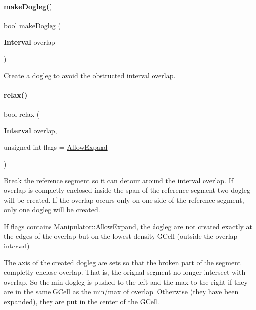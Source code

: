 \paragraph{\texorpdfstring{make\+Dogleg()}{makeDogleg()}\hspace{0.1cm}{\footnotesize\ttfamily [3/3]}}
{\footnotesize\ttfamily bool make\+Dogleg (\begin{DoxyParamCaption}\item[{\textbf{ Interval}}]{overlap }\end{DoxyParamCaption})}

Create a dogleg to avoid the obstructed interval {\ttfamily overlap}. \mbox{\label{classKite_1_1Manipulator_a8b5b69fd5762d5a0cbc4ceea4d1b68c1}} 
\paragraph{\texorpdfstring{relax()}{relax()}}
{\footnotesize\ttfamily bool relax (\begin{DoxyParamCaption}\item[{\textbf{ Interval}}]{overlap,  }\item[{unsigned int}]{flags = {\ttfamily \hyperlink{classKite_1_1Manipulator_a2af2ad6b6441614038caf59d04b3b217a41880b9f6652400677e21c8681f97675}{Allow\+Expand}} }\end{DoxyParamCaption})}

Break the reference segment so it can detour around the interval {\ttfamily overlap}. If {\ttfamily overlap} is completly enclosed inside the span of the reference segment two dogleg will be created. If the overlap occurs only on one side of the reference segment, only one dogleg will be created.

If {\ttfamily flags} contains \hyperlink{classKite_1_1Manipulator_a2af2ad6b6441614038caf59d04b3b217a41880b9f6652400677e21c8681f97675}{Manipulator\+::\+Allow\+Expand}, the dogleg are not created exactly at the edges of the overlap but on the lowest density G\+Cell (outside the overlap interval).

The axis of the created dogleg are sets so that the broken part of the segment completly enclose {\ttfamily overlap}. That is, the orignal segment no longer intersect with {\ttfamily overlap}. So the min dogleg is pushed to the left and the max to the right if they are in the same G\+Cell as the min/max of {\ttfamily overlap}. Otherwise (they have been expanded), they are put in the center of the G\+Cell.

